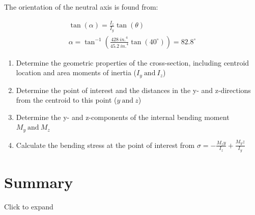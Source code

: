 \documentclass[
  letterpaper,
  DIV=11,
  numbers=noendperiod]{scrreprt}
\begin{document}
\begin{tcolorbox}
\begin{tcolorbox}
The orientation of the neutral axis is found from:

\[
\begin{gathered}
\tan (\alpha)=\frac{I_z}{I_y} \tan (\theta) \\
\alpha=\tan ^{-1}\left(\frac{428{~in.}^4}{45.2{~in.}^4} \tan \left(40^{\circ}\right)\right)=82.8^{\circ}
\end{gathered}
\]

\end{tcolorbox}

\end{tcolorbox}

\begin{tcolorbox}[enhanced jigsaw, breakable, opacityback=0, toptitle=1mm, left=2mm, colback=white, opacitybacktitle=0.6, colframe=quarto-callout-warning-color-frame, titlerule=0mm, arc=.35mm, leftrule=.75mm, bottomtitle=1mm, colbacktitle=quarto-callout-warning-color!10!white, rightrule=.15mm, title=\textcolor{quarto-callout-warning-color}{\faExclamationTriangle}\hspace{0.5em}{Step-by-step: Unsymmetric Bending}, bottomrule=.15mm, toprule=.15mm, coltitle=black]

\begin{enumerate}
\def\labelenumi{\arabic{enumi}.}
\item
  Determine the geometric properties of the cross-section, including
  centroid location and area moments of inertia (\(I_y~\text{and}~I_z\))
\item
  Determine the point of interest and the distances in the y- and
  z-directions from the centroid to this point (\(y~\text{and}~z\))
\item
  Determine the y- and z-components of the internal bending moment
  \(M_y~\text{and}~M_z\)
\item
  Calculate the bending stress at the point of interest from
  \(\sigma=-\frac{M_z y}{I_z}+\frac{M_y z}{I_y}\)
\end{enumerate}

\end{tcolorbox}

\section*{Summary}\label{summary-7}


Click to expand
\end{document}
